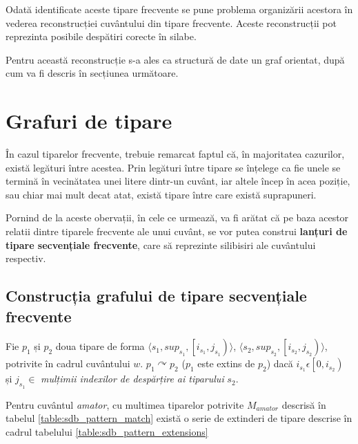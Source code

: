 Odată identificate aceste tipare frecvente se pune problema organizării acestora în vederea reconstrucției cuvântului din tipare frecvente. Aceste reconstrucții pot reprezinta posibile despătiri corecte în silabe. 

Pentru această reconstrucție s-a ales ca structură de date un graf orientat, după cum va fi descris în secțiunea următoare.

\section{Grafuri de tipare}

În cazul tiparelor frecvente, trebuie remarcat faptul că, în majoritatea cazurilor, există legături între acestea. Prin legături între tipare se înțelege ca fie unele se termină în vecinătatea unei litere dintr-un cuvânt, iar altele încep în acea poziție, sau chiar mai mult decat atat, există tipare între care există suprapuneri. 

Pornind de la aceste obervații, în cele ce urmează, va fi arătat că pe baza acestor relatii dintre tiparele frecvente ale unui cuvânt, se vor putea construi \textbf{lanțuri de tipare secvențiale frecvente}, care să reprezinte silibisiri ale cuvântului respectiv.

\subsection{Construcția grafului de tipare secvențiale frecvente}
\begin{defi}
Fie $p_1$ și $p_2$ doua tipare de forma  $\langle s_1,sup_{s_1}, \left[i_{s_1},j_{s_1}\right) \rangle$, $\langle s_2,sup_{s_2}, \left[i_{s_2},j_{s_2}\right)\rangle $, potrivite în cadrul cuvântului $w$. $p_1 \curvearrowright p_2$ ($p_1$ este extins de $p_2$) dacă $i_{s_1} \epsilon \left[0, i_{s_2}\right)$ și $j_{s_1}\in $ \textit{mulțimii indexilor de despărțire ai tiparului} $s_2$. 
\end{defi}

\begin{ex}
Pentru cuvântul \textit{amator}, cu multimea tiparelor potrivite $M_{amator}$ descrisă în tabelul \ref{table:sdb_pattern_match} există o serie de extinderi de tipare descrise în cadrul tabelului \ref{table:sdb_pattern_extensions}
\end{ex}

